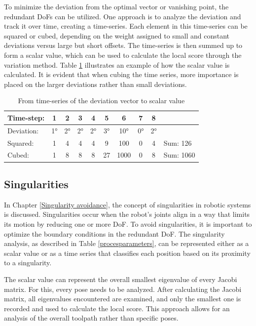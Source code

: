 To minimize the deviation from the optimal vector or vanishing point, the redundant \acrshort{DoF}s can be utilized. One approach is to analyze the deviation and track it over time, creating a time-series. Each element in this time-series can be squared or cubed, depending on the weight assigned to small and constant deviations versus large but short offsets. The time-series is then summed up to form a scalar value, which can be used to calculate the local score through the variation method. Table \ref{deviation} illustrates an example of how the scalar value is calculated. It is evident that when cubing the time series, more importance is placed on the larger deviations rather than small deviations.


\begin{table}[H]
	\centering
	\begin{tabular}{||l|c|c|c|c|c|c|c|c|l||}
		\hline
		Time-step:  & 1 & 2& 3& 4& 5& 6& 7& 8&  \\
		\hline
		Deviation:  & 1° & 2°& 2°& 2°& 3°& 10°& 0°& 2°&  \\
		\hline
		\hline
		Squared:  & 1 & 4& 4& 4& 9& 100& 0& 4& Sum: 126  \\
		Cubed:  & 1 & 8& 8& 8& 27& 1000& 0& 8& Sum: 1060  \\
		\hline
		\hline
		
	\end{tabular}
	
	\caption{From time-series of the deviation vector to scalar value}
	\label{deviation}
\end{table}

 

\subsection{Singularities}

In Chapter \ref{Singularity avoidance}, the concept of singularities in robotic systems is discussed. Singularities occur when the robot's joints align in a way that limits its motion by reducing one or more \acrshort{DoF}. To avoid singularities, it is important to optimize the boundary conditions in the redundant \acrshort{DoF}. The singularity analysis, as described in Table \ref{procesparameters}, can be represented either as a scalar value or as a time series that classifies each position based on its proximity to a singularity.

The scalar value can represent the overall smallest eigenvalue of every Jacobi matrix. For this, every pose needs to be analyzed. After calculating the Jacobi matrix, all eigenvalues encountered are examined, and only the smallest one is recorded and used to calculate the local score. This approach allows for an analysis of the overall toolpath rather than specific poses.


